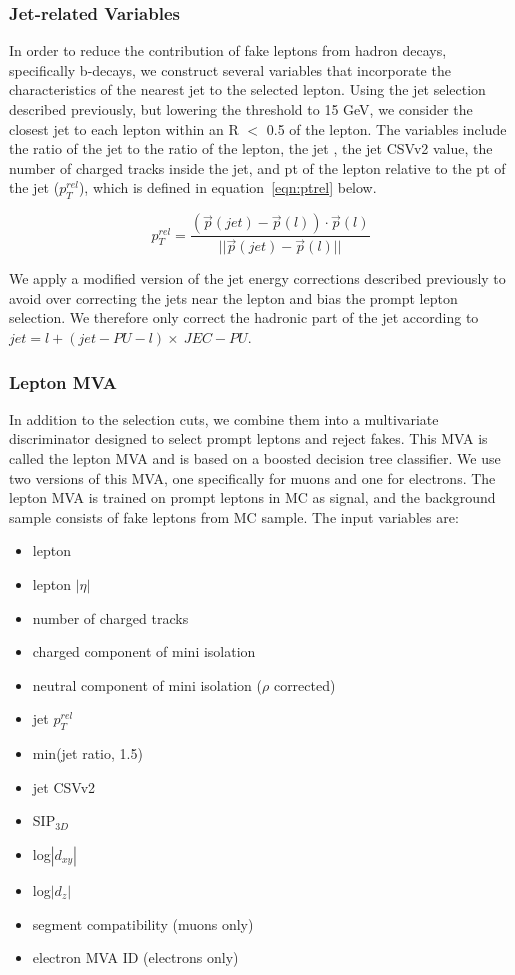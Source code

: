 \subsubsection{Jet-related Variables}
In order to reduce the contribution of fake leptons from hadron decays, specifically b-decays, we construct several variables that incorporate
the characteristics of the nearest jet to the selected lepton. Using the jet selection described previously, but lowering the \pt threshold to
15 GeV, we consider the closest jet to each lepton within an R $<$ 0.5 of the lepton. The variables include the ratio of the jet to the ratio
of the lepton, the jet \pt, the jet CSVv2 value, the number of charged tracks inside the jet, and pt of the lepton relative to the pt of the jet
($p_{T}^{rel}$), which is defined in equation~\ref{eqn:ptrel} below. 

\begin{equation}
\label{eqn:ptrel}
 p_{T}^{rel} = \frac{(\vec{p}(jet)-\vec{p}(l))\cdot\vec{p}(l)}{||\vec{p}(jet)-\vec{p}(l)||}
\end{equation}

We apply a modified version of the jet energy corrections described previously to avoid over correcting the jets near the lepton and bias the 
prompt lepton selection. We therefore only correct the hadronic part of the jet according to $jet = l + (jet-PU-l)\times~JEC - PU$.  

\subsubsection{Lepton MVA}
In addition to the selection cuts, we combine them into a multivariate discriminator designed to select prompt leptons and reject fakes.
This MVA is called the lepton MVA and is based on a boosted decision tree classifier. We use two versions of this MVA, one specifically for
muons and one for electrons. The lepton MVA is trained on prompt leptons in \tth
MC as signal, and the background sample consists of fake leptons from \ttbar MC sample. The input variables are: 

\begin{itemize}
  \item lepton \pt
  \item lepton $|\eta|$
  \item number of charged tracks
  \item charged component of mini isolation
  \item neutral component of mini isolation ($\rho$ corrected)
  \item jet $p_{T}^{rel}$
  \item min(jet \pt ratio, 1.5)
  \item jet CSVv2
  \item SIP$_{3D}$
  \item log$|d_{xy}|$
  \item log$|d_{z}|$
  \item segment compatibility (muons only)
  \item electron MVA ID (electrons only)
\end{itemize}

